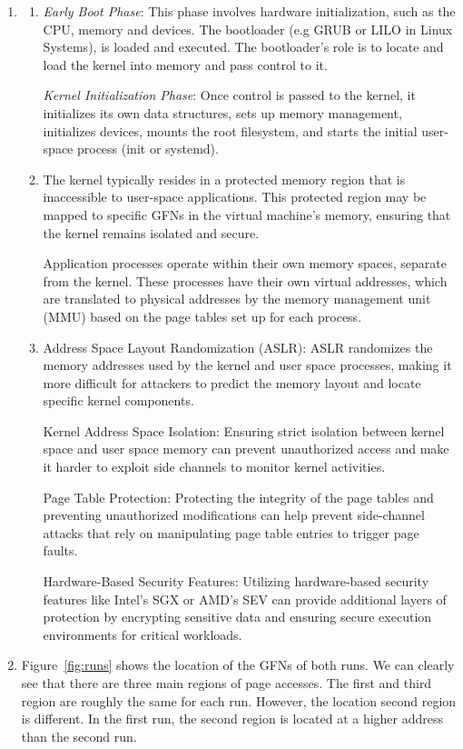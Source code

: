 \documentclass[sheet=1, english]{dexercise}
\begin{document}
\begin{enumerate}
  \item
    \begin{enumerate}
      \item
        \emph{Early Boot Phase}: This phase involves hardware initialization, such
        as the CPU, memory and devices. The bootloader (e.g GRUB or LILO in
        Linux Systems), is loaded and executed. The bootloader's role is to
        locate and load the kernel into memory and pass control to it.

        \emph{Kernel Initialization Phase}: Once control is passed to the kernel,
        it initializes its own data structures, sets up memory management,
        initializes devices, mounts the root filesystem, and starts the
        initial user-space process (init or systemd).

      \item
        The kernel typically resides in a protected memory region that is
        inaccessible to user-space applications. This protected region may
        be mapped to specific GFNs in the virtual machine's memory, ensuring
        that the kernel remains isolated and secure.

        Application processes operate within their own memory spaces,
        separate from the kernel. These processes have their own virtual
        addresses, which are translated to physical addresses by the memory
        management unit (MMU) based on the page tables set up for each
        process.

      \item
        Address Space Layout Randomization (ASLR): ASLR randomizes the memory
        addresses used by the kernel and user space processes, making it more
        difficult for attackers to predict the memory layout and locate
        specific kernel components.

        Kernel Address Space Isolation: Ensuring strict isolation between
        kernel space and user space memory can prevent unauthorized access and
        make it harder to exploit side channels to monitor kernel activities.

        Page Table Protection: Protecting the integrity of the page tables and
        preventing unauthorized modifications can help prevent side-channel
        attacks that rely on manipulating page table entries to trigger page
        faults.

        Hardware-Based Security Features: Utilizing hardware-based security
        features like Intel's SGX or AMD's SEV can provide additional layers of
        protection by encrypting sensitive data and ensuring secure execution
        environments for critical workloads.
    \end{enumerate}
  \item
    Figure~\ref{fig:runs} shows the location of the GFNs of both runs. We can
    clearly see that there are three main regions of page accesses. The first
    and third region are roughly the same for each run. However, the location
    second region is different. In the first run, the second region is located
    at a higher address than the second run.


\end{enumerate}
\end{document}
